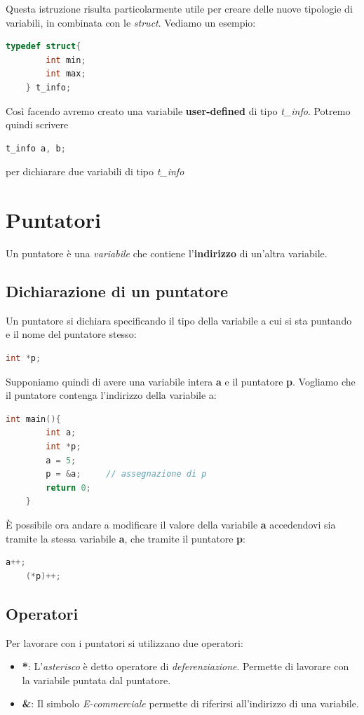 \documentclass[a4paper,11pt,oneside]{book}
\begin{document}
Questa istruzione risulta particolarmente utile per creare delle nuove tipologie di variabili, in combinata con le \emph{struct}.
Vediamo un esempio:
\begin{lstlisting}[language=C]
    typedef struct{
        int min;
        int max;
    } t_info; 
\end{lstlisting}
Così facendo avremo creato una variabile \textbf{user-defined} di tipo \emph{t\_info}.
Potremo quindi scrivere
\begin{lstlisting}[language=C]
    t_info a, b;
\end{lstlisting}
per dichiarare due variabili di tipo \emph{t\_info}

\chapter{Puntatori}
Un puntatore è una \emph{variabile} che contiene l'\textbf{indirizzo} di un'altra variabile.

\section{Dichiarazione di un puntatore}
Un puntatore si dichiara specificando il tipo della variabile a cui si sta puntando e il nome del puntatore stesso:
\begin{lstlisting}[language=C]
    int *p;
\end{lstlisting}

Supponiamo quindi di avere una variabile intera \textbf{a} e il puntatore \textbf{p}. Vogliamo che il puntatore contenga l'indirizzo della 
variabile a:
\begin{lstlisting}[language=C]
    int main(){
        int a;
        int *p;
        a = 5;
        p = &a;     // assegnazione di p
        return 0;
    } 
\end{lstlisting}
È possibile ora andare a modificare il valore della variabile \textbf{a} accedendovi sia tramite la stessa variabile \textbf{a}, che tramite il puntatore \textbf{p}:
\begin{lstlisting}[language=C]
    a++;
    (*p)++;
\end{lstlisting}

\section{Operatori}
Per lavorare con i puntatori si utilizzano due operatori:
\begin{itemize}
    \item \textbf{*}: L'\emph{asterisco} è detto operatore di \emph{deferenziazione}. Permette di lavorare con la variabile puntata dal puntatore.
    \item \textbf{\&}: Il simbolo \emph{E-commerciale} permette di riferirsi all'indirizzo di una variabile.
\end{itemize}
\end{document}
